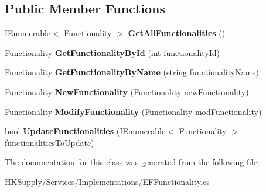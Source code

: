 \subsection*{Public Member Functions}
\begin{DoxyCompactItemize}
\item 
\mbox{\label{class_h_k_supply_1_1_services_1_1_implementations_1_1_e_f_functionality_ab92f666d01076cffafbddbb91c5cf6af}} 
I\+Enumerable$<$ \hyperlink{class_h_k_supply_1_1_models_1_1_functionality}{Functionality} $>$ {\bfseries Get\+All\+Functionalities} ()
\item 
\mbox{\label{class_h_k_supply_1_1_services_1_1_implementations_1_1_e_f_functionality_a0aa6fc75b8f1ddf6532f39a84bc50ad9}} 
\hyperlink{class_h_k_supply_1_1_models_1_1_functionality}{Functionality} {\bfseries Get\+Functionality\+By\+Id} (int functionality\+Id)
\item 
\mbox{\label{class_h_k_supply_1_1_services_1_1_implementations_1_1_e_f_functionality_a655784ce048904e9f27a827ccf2a7a79}} 
\hyperlink{class_h_k_supply_1_1_models_1_1_functionality}{Functionality} {\bfseries Get\+Functionality\+By\+Name} (string functionality\+Name)
\item 
\mbox{\label{class_h_k_supply_1_1_services_1_1_implementations_1_1_e_f_functionality_a43852b181d280c78c7c00b9d11c6d6c4}} 
\hyperlink{class_h_k_supply_1_1_models_1_1_functionality}{Functionality} {\bfseries New\+Functionality} (\hyperlink{class_h_k_supply_1_1_models_1_1_functionality}{Functionality} new\+Functionality)
\item 
\mbox{\label{class_h_k_supply_1_1_services_1_1_implementations_1_1_e_f_functionality_ae4f83037cd6ef526f55de1a2ba442cc6}} 
\hyperlink{class_h_k_supply_1_1_models_1_1_functionality}{Functionality} {\bfseries Modify\+Functionality} (\hyperlink{class_h_k_supply_1_1_models_1_1_functionality}{Functionality} mod\+Functionality)
\item 
\mbox{\label{class_h_k_supply_1_1_services_1_1_implementations_1_1_e_f_functionality_a2093874e195260c8963796b45aeba022}} 
bool {\bfseries Update\+Functionalities} (I\+Enumerable$<$ \hyperlink{class_h_k_supply_1_1_models_1_1_functionality}{Functionality} $>$ functionalities\+To\+Update)
\end{DoxyCompactItemize}


The documentation for this class was generated from the following file\+:\begin{DoxyCompactItemize}
\item 
H\+K\+Supply/\+Services/\+Implementations/E\+F\+Functionality.\+cs\end{DoxyCompactItemize}
